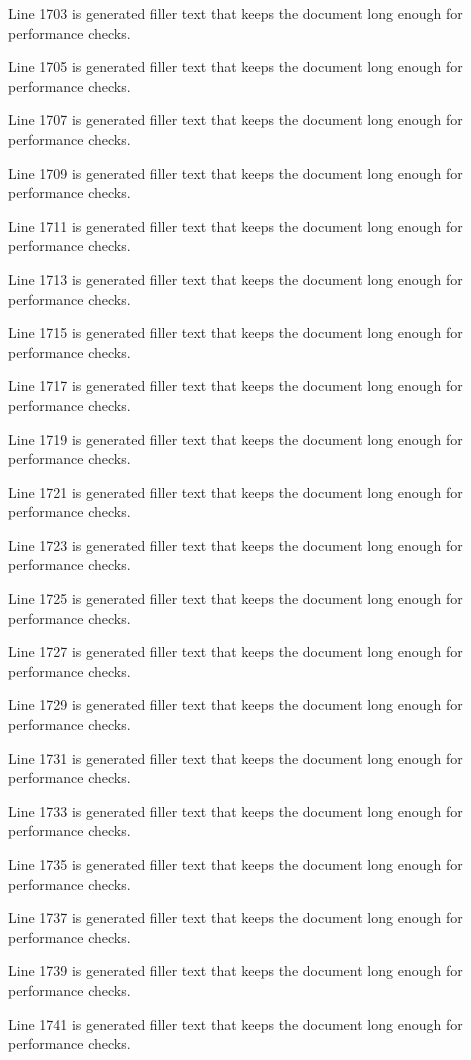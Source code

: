 Line 1703 is generated filler text that keeps the document long enough for performance checks.

Line 1705 is generated filler text that keeps the document long enough for performance checks.

Line 1707 is generated filler text that keeps the document long enough for performance checks.

Line 1709 is generated filler text that keeps the document long enough for performance checks.

Line 1711 is generated filler text that keeps the document long enough for performance checks.

Line 1713 is generated filler text that keeps the document long enough for performance checks.

Line 1715 is generated filler text that keeps the document long enough for performance checks.

Line 1717 is generated filler text that keeps the document long enough for performance checks.

Line 1719 is generated filler text that keeps the document long enough for performance checks.

Line 1721 is generated filler text that keeps the document long enough for performance checks.

Line 1723 is generated filler text that keeps the document long enough for performance checks.

Line 1725 is generated filler text that keeps the document long enough for performance checks.

Line 1727 is generated filler text that keeps the document long enough for performance checks.

Line 1729 is generated filler text that keeps the document long enough for performance checks.

Line 1731 is generated filler text that keeps the document long enough for performance checks.

Line 1733 is generated filler text that keeps the document long enough for performance checks.

Line 1735 is generated filler text that keeps the document long enough for performance checks.

Line 1737 is generated filler text that keeps the document long enough for performance checks.

Line 1739 is generated filler text that keeps the document long enough for performance checks.

Line 1741 is generated filler text that keeps the document long enough for performance checks.

